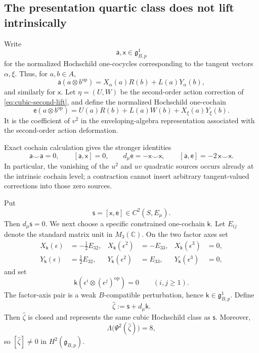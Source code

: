 \documentclass[11pt]{amsart}
\newcommand{\C}{\mathbb C}
\newcommand{\ghoch}{\mathfrak g}
\begin{document}
\subsection{The presentation quartic class does not lift intrinsically}\label{subsec:intrinsic-quartic}

Write
\[
\mathsf a,\mathsf x\in\ghoch^1_{B,p}
\]
for the normalized Hochschild one-cocycles corresponding to the tangent vectors
$\alpha,\xi$.  Thus, for $a,b\in A$,
\[
\mathsf a(a\otimes b^{\mathrm{op}})
=
X_\alpha(a)R(b)+L(a)Y_\alpha(b),
\]
and similarly for $\mathsf x$.
Let $\eta=(U,W)$ be the second-order action correction of
\eqref{eq:cubic-second-lift}, and define the normalized Hochschild one-cochain
\[
\mathsf e(a\otimes b^{\mathrm{op}})
=
U(a)R(b)+L(a)W(b)+X_\xi(a)Y_\xi(b).
\]
It is the coefficient of $v^2$ in the enveloping-algebra representation
associated with the second-order action deformation.

Exact cochain calculation gives the stronger identities
\begin{equation}\label{eq:intrinsic-low-identities}
\mathsf a\smile\mathsf a=0,
\qquad
[\mathsf a,\mathsf x]=0,
\qquad
 d_\mu\mathsf e=-\mathsf x\smile\mathsf x,
\qquad
[\mathsf a,\mathsf e]=-2\,\mathsf x\smile\mathsf x.
\end{equation}
In particular, the vanishing of the $u^2$ and $uv$ quadratic sources occurs already at the intrinsic cochain level; a contraction cannot insert arbitrary tangent-valued corrections into those zero sources.

Put
\[
\mathsf s=[\mathsf x,\mathsf e]\in C^2(S,E_\mu).
\]
Then $d_\mu\mathsf s=0$.  We next choose a specific constrained one-cochain $\mathsf k$.
Let $E_{ij}$ denote the standard matrix unit in $M_3(\C)$.  On the two factor axes set
\begin{align*}
X_{\mathsf k}(\epsilon)&=-\tfrac12E_{32},
&X_{\mathsf k}(\epsilon^2)&=-E_{33},
&X_{\mathsf k}(\epsilon^3)&=0,\\
Y_{\mathsf k}(\epsilon)&=\tfrac12E_{32},
&Y_{\mathsf k}(\epsilon^2)&=E_{33},
&Y_{\mathsf k}(\epsilon^3)&=0,
\end{align*}
and set
\[
\mathsf k(\epsilon^i\otimes(\epsilon^j)^{\mathrm{op}})=0
\qquad(i,j\ge1).
\]
The factor-axis pair is a weak $B$-compatible perturbation, hence
$\mathsf k\in\ghoch^1_{B,p}$.
Define
\[
\widehat\zeta:=\mathsf s+d_\mu\mathsf k.
\]
Then $\widehat\zeta$ is closed and represents the same cubic Hochschild class as
$\mathsf s$.  Moreover,
\begin{equation}\label{eq:intrinsic-zeta-projection}
\Lambda\bigl(\Psi^2(\widehat\zeta)\bigr)=8,
\end{equation}
so $[\widehat\zeta]\ne0$ in $H^2(\ghoch_{B,p})$.
\end{document}
